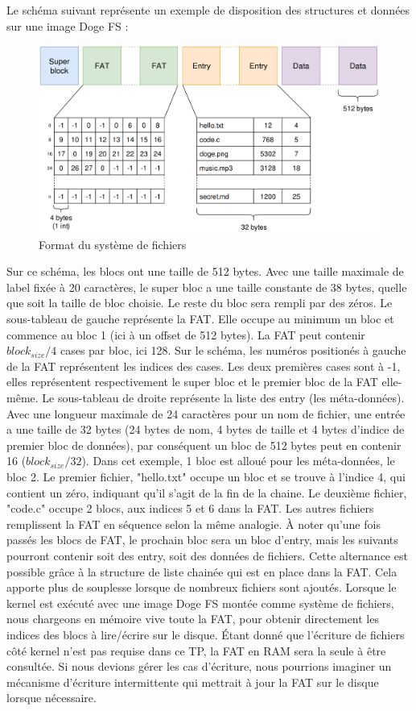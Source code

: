 \documentclass[a4paper, 12pt]{article}
\begin{document}
Le schéma suivant représente un exemple de disposition des structures et données sur une image Doge FS :
\begin{figure}
	\begin{center}
		\includegraphics[width=1.0\textwidth]{schema.png}
		\caption{Format du système de fichiers}
	\end{center}
\end{figure}
Sur ce schéma, les blocs ont une taille de 512 bytes. Avec une taille maximale de label fixée à 20 caractères,
le super bloc a une taille constante de 38 bytes, quelle que soit la taille de bloc choisie. Le reste du bloc
sera rempli par des zéros.
Le sous-tableau de gauche représente la FAT. Elle occupe au minimum un bloc et commence au bloc 1 (ici à un offset de 512 bytes).
La FAT peut contenir $block_{size} / 4$ cases par bloc, ici 128. Sur le schéma, les numéros positionés à gauche de la
FAT représentent les indices des cases. Les deux premières cases sont à -1, elles représentent respectivement
le super bloc et le premier bloc de la FAT elle-même.
Le sous-tableau de droite représente la liste des entry (les méta-données). Avec une longueur maximale de 24
caractères pour un nom de fichier, une entrée a une taille de 32 bytes (24 bytes de nom, 4 bytes de taille et
4 bytes d'indice de premier bloc de données), par conséquent un bloc de 512 bytes peut en contenir 16 
($block_{size} / 32$).
\bigbreak
Dans cet exemple, 1 bloc est alloué pour les méta-données, le bloc 2. 
Le premier fichier, "hello.txt" occupe un bloc et se trouve à l'indice 4, qui contient un zéro, indiquant 
qu'il s'agit de la fin de la chaine. Le deuxième fichier, "code.c" occupe 2 blocs, aux indices 5 et 6 dans la FAT.
Les autres fichiers remplissent la FAT en séquence selon la même analogie.
À noter qu'une fois passés les blocs de FAT, le prochain bloc sera un bloc d'entry, mais les suivants pourront
contenir soit des entry, soit des données de fichiers. Cette alternance est possible grâce à la structure 
de liste chainée qui est en place dans la FAT. Cela apporte plus de souplesse lorsque de nombreux fichiers 
sont ajoutés.
\bigbreak
Lorsque le kernel est exécuté avec une image Doge FS montée comme système de fichiers, nous chargeons en 
mémoire vive toute la FAT, pour obtenir directement les indices des blocs à lire/écrire sur le disque. Étant 
donné que l'écriture de fichiers côté kernel n'est pas requise dans ce TP, la FAT en RAM sera la seule à être 
consultée. Si nous devions gérer les cas d'écriture, nous pourrions imaginer un mécanisme d'écriture intermittente
qui mettrait à jour la FAT sur le disque lorsque nécessaire.
\end{document}
